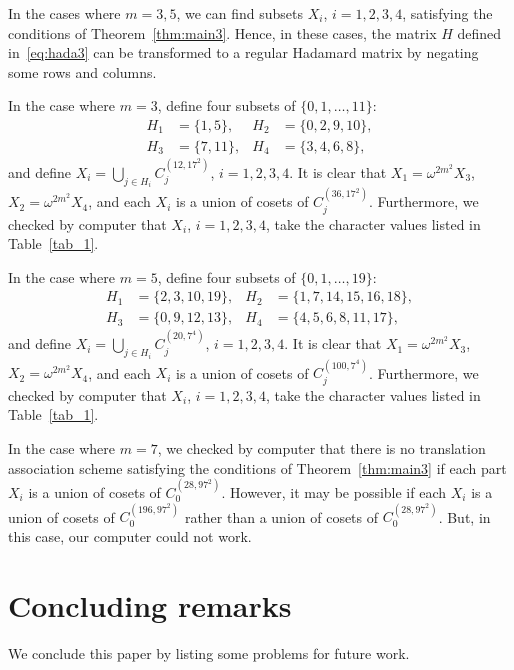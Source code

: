 \documentclass[ALCO,ThmDefs,Unicode]{cedram}
\begin{document}
\begin{exam*}
In the cases where $m=3,5$, we can find subsets $X_i$, $i=1,2,3,4$, satisfying the conditions of Theorem~\ref{thm:main3}. Hence, in these cases, the matrix $H$ defined in~\eqref{eq:hada3} can be transformed to a regular Hadamard matrix by negating some rows and columns.

In the case where $m=3$, define four subsets of $\{0,1,\ldots,11\}$:
\[
\begin{aligned}
H_1&=\{1,5\}, &H_2&=\{0,2,9,10\}, \\
H_3&=\{7,11\}, &H_4&=\{3,4,6,8\},
\end{aligned}
\]
and define $X_i=\bigcup_{j\in H_i}C_j^{(12,17^2)}$, $i=1,2,3,4$. It is clear that $X_1=\omega^{2m^2} X_3$, $X_2=\omega^{2m^2} X_4$, and each $X_i$ is a union of cosets of $C_j^{(36,17^2)}$. Furthermore, we checked by computer that $X_i$, $i=1,2,3,4$, take the character values listed in Table~\ref{tab_1}.

In the case where $m=5$, define four subsets of $\{0,1,\ldots,19\}$:
\[
\begin{aligned}
H_1&=\{2,3,10,19\}, & H_2&=\{1, 7, 14, 15, 16, 18\}, \\
H_3&=\{0,9,12,13\}, & H_4&=\{4, 5, 6, 8, 11, 17\},
\end{aligned}
\]
and define $X_i=\bigcup_{j\in H_i}C_j^{(20,7^4)}$, $i=1,2,3,4$. It is clear that $X_1=\omega^{2m^2} X_3$, $X_2=\omega^{2m^2} X_4$, and each $X_i$ is a union of cosets of $C_j^{(100,7^4)}$. Furthermore, we checked by computer that $X_i$, $i=1,2,3,4$, take the character values listed in Table~\ref{tab_1}.

In the case where $m=7$, we checked by computer that there is no translation association scheme satisfying the conditions of Theorem~\ref{thm:main3} if each part $X_i$ is a union of cosets of $C_0^{(28,97^2)}$. However, it may be possible if each $X_i$ is a union of cosets of $C_0^{(196,97^2)}$ rather than a union of cosets of $C_0^{(28,97^2)}$. But, in this case, our computer could not work.
\end{exam*}


\section{Concluding remarks}

We conclude this paper by listing some problems for future work.
\end{document}
